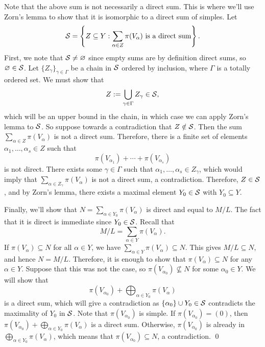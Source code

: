 \begin{enumerate}[(1)]
    Note that the above sum is not necessarily a direct sum. This is where 
    we'll use Zorn's lemma to show that it is isomorphic to a direct sum of 
    simples. Let 
    \[ {\cal S} = \left\{Z \subseteq Y : \sum_{\alpha \in Z} \pi(V_\alpha) 
    \text{ is a direct sum} \right\}. \] 
    First, we note that ${\cal S} \neq \varnothing$ since empty sums are 
    by definition direct sums, so $\varnothing \in {\cal S}$. Let 
    $\{Z_\gamma\}_{\gamma \in \Gamma}$ be a chain in ${\cal S}$ ordered by 
    inclusion, where $\Gamma$ is a totally ordered set. We must show that 
    \[ Z := \bigcup_{\gamma \in \Gamma} Z_\gamma \in {\cal S}, \] 
    which will be an upper bound in the chain, in which case we can apply 
    Zorn's lemma to ${\cal S}$. So suppose towards a contradiction that 
    $Z \notin {\cal S}$. Then the sum $\sum_{\alpha \in Z} \pi(V_\alpha)$ 
    is not a direct sum. Therefore, there is a finite set of elements 
    $\alpha_1, \dots, \alpha_s \in Z$ such that 
    \[ \pi(V_{\alpha_1}) + \cdots + \pi(V_{\alpha_s}) \] 
    is not direct. There exists some $\gamma \in \Gamma$ such that 
    $\alpha_1, \dots, \alpha_s \in Z_\gamma$, which would imply that 
    $\sum_{\alpha \in Z_\gamma} \pi(V_\alpha)$ is not a direct sum, a contradiction. 
    Therefore, $Z \in {\cal S}$, and by Zorn's lemma, there exists a maximal 
    element $Y_0 \in {\cal S}$ with $Y_0 \subseteq Y$. 

    Finally, we'll show that $N = \sum_{\alpha \in Y_0} \pi(V_\alpha)$ is 
    direct and equal to $M/L$. The fact that it is direct is immediate since 
    $Y_0 \in {\cal S}$. Recall that 
    \[ M/L = \sum_{\alpha \in Y} \pi(V_\alpha). \] 
    If $\pi(V_\alpha) \subseteq N$ for all $\alpha \in Y$, we have 
    $\sum_{\alpha \in Y} \pi(V_\alpha) \subseteq N$. This gives $M/L \subseteq N$, 
    and hence $N = M/L$. Therefore, it is enough to show that $\pi(V_\alpha) 
    \subseteq N$ for any $\alpha \in Y$. Suppose that this was not the case, 
    so $\pi(V_{\alpha_0}) \not\subseteq N$ for some $\alpha_0 \in Y$. 
    We will show that 
    \[ \pi(V_{\alpha_0}) + \bigoplus_{\alpha \in Y_0} \pi(V_\alpha) \] 
    is a direct sum, which will give a contradiction as $\{\alpha_0\} 
    \cup Y_0 \in {\cal S}$ contradicts the maximality of $Y_0$ in ${\cal S}$. 
    Note that $\pi(V_{\alpha_0})$ is simple. If $\pi(V_{\alpha_0}) = (0)$, then 
    $\pi(V_{\alpha_0}) + \bigoplus_{\alpha \in Y_0} \pi(V_\alpha)$ is a direct 
    sum. Otherwise, $\pi(V_{\alpha_0})$ is already in 
    $\bigoplus_{\alpha \in Y_0} \pi(V_\alpha)$, which means that 
    $\pi(V_{\alpha_0}) \subseteq N$, a contradiction. \qed 
\end{enumerate}
